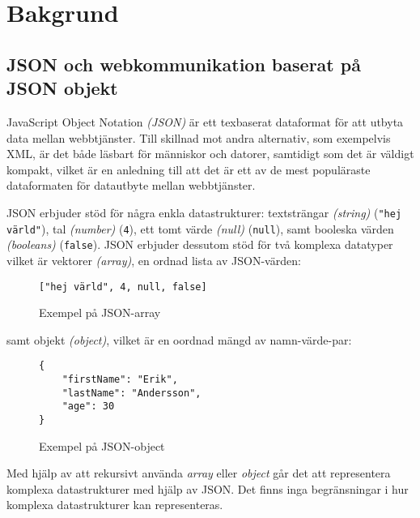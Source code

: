 \documentclass[swedish]{kththesis}
\begin{document}

\section{Bakgrund}


\subsection{JSON och webkommunikation baserat på JSON objekt}
\label{sec:intr:bakgrund:json}
JavaScript Object Notation \textit{(JSON)} är ett texbaserat dataformat för att utbyta data mellan webbtjänster. Till skillnad mot andra alternativ, som exempelvis XML, är det både läsbart för människor och datorer, samtidigt som det är väldigt kompakt, vilket är en anledning till att det är ett av de mest populäraste dataformaten för datautbyte mellan webbtjänster. \cite{Pezoa2016} 

JSON erbjuder stöd för några enkla datastrukturer: textsträngar \textit{(string)} (\texttt{"hej värld"}), tal \textit{(number)} (\texttt{4}), ett tomt värde \textit{(null)} (\texttt{null}), samt booleska värden \textit{(booleans)} (\texttt{false}). JSON erbjuder dessutom stöd för två komplexa datatyper vilket är vektorer \textit{(array)}, en ordnad lista av JSON-värden:

\begin{figure}[h]
	\begin{verbatim}
["hej värld", 4, null, false]
	\end{verbatim}
	\vspace{-1.5em}
	\caption{Exempel på JSON-array}
\end{figure}

\noindent
samt objekt \textit{(object)}, vilket är en oordnad mängd av namn-värde-par:

\begin{figure}[h]
	\begin{verbatim}
{
	"firstName": "Erik",
	"lastName": "Andersson",
	"age": 30
}
	\end{verbatim}
	\vspace{-1.5em}
	\caption{Exempel på JSON-object}
	\label{fig:json-object-example}
\end{figure}

\noindent
Med hjälp av att rekursivt använda \textit{array} eller \textit{object} går det att representera komplexa datastrukturer med hjälp av JSON. Det finns inga begränsningar i hur komplexa datastrukturer kan representeras.
\end{document}
